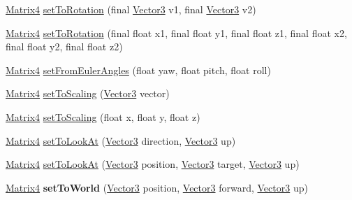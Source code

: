 \begin{DoxyCompactItemize}
\item 
\hyperlink{classairhockeyjava_1_1util_1_1_matrix4}{Matrix4} \hyperlink{classairhockeyjava_1_1util_1_1_matrix4_aaf8e51e7408ad7da64c95284cb052973}{set\+To\+Rotation} (final \hyperlink{classairhockeyjava_1_1util_1_1_vector3}{Vector3} v1, final \hyperlink{classairhockeyjava_1_1util_1_1_vector3}{Vector3} v2)
\item 
\hyperlink{classairhockeyjava_1_1util_1_1_matrix4}{Matrix4} \hyperlink{classairhockeyjava_1_1util_1_1_matrix4_aa1ba0d9f2ea10bffe6addcda68c1b72f}{set\+To\+Rotation} (final float x1, final float y1, final float z1, final float x2, final float y2, final float z2)
\item 
\hyperlink{classairhockeyjava_1_1util_1_1_matrix4}{Matrix4} \hyperlink{classairhockeyjava_1_1util_1_1_matrix4_aab318582a2ec332f3a792fa5a092ddb3}{set\+From\+Euler\+Angles} (float yaw, float pitch, float roll)
\item 
\hyperlink{classairhockeyjava_1_1util_1_1_matrix4}{Matrix4} \hyperlink{classairhockeyjava_1_1util_1_1_matrix4_aa60fdd491f49f219beedfa26007cdaea}{set\+To\+Scaling} (\hyperlink{classairhockeyjava_1_1util_1_1_vector3}{Vector3} vector)
\item 
\hyperlink{classairhockeyjava_1_1util_1_1_matrix4}{Matrix4} \hyperlink{classairhockeyjava_1_1util_1_1_matrix4_a0b0f80cf7c67b9735328a4adcaf89b04}{set\+To\+Scaling} (float x, float y, float z)
\item 
\hyperlink{classairhockeyjava_1_1util_1_1_matrix4}{Matrix4} \hyperlink{classairhockeyjava_1_1util_1_1_matrix4_a541da8eea1282aff2a77a155cb456ae3}{set\+To\+Look\+At} (\hyperlink{classairhockeyjava_1_1util_1_1_vector3}{Vector3} direction, \hyperlink{classairhockeyjava_1_1util_1_1_vector3}{Vector3} up)
\item 
\hyperlink{classairhockeyjava_1_1util_1_1_matrix4}{Matrix4} \hyperlink{classairhockeyjava_1_1util_1_1_matrix4_ab2c901c89e34672519a23c3d1e4bfa68}{set\+To\+Look\+At} (\hyperlink{classairhockeyjava_1_1util_1_1_vector3}{Vector3} position, \hyperlink{classairhockeyjava_1_1util_1_1_vector3}{Vector3} target, \hyperlink{classairhockeyjava_1_1util_1_1_vector3}{Vector3} up)
\item 
\hypertarget{classairhockeyjava_1_1util_1_1_matrix4_a5a4c4e3eb4af3f2a753405f550cc7203}{}\hyperlink{classairhockeyjava_1_1util_1_1_matrix4}{Matrix4} {\bfseries set\+To\+World} (\hyperlink{classairhockeyjava_1_1util_1_1_vector3}{Vector3} position, \hyperlink{classairhockeyjava_1_1util_1_1_vector3}{Vector3} forward, \hyperlink{classairhockeyjava_1_1util_1_1_vector3}{Vector3} up)\label{classairhockeyjava_1_1util_1_1_matrix4_a5a4c4e3eb4af3f2a753405f550cc7203}


\end{DoxyCompactItemize}
